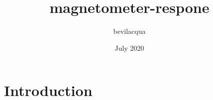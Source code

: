 \documentclass{article}
\title{magnetometer-respone}
\author{bevilacqua }
\date{July 2020}
\begin{document}
\maketitle

\section{Introduction}
\end{document}

